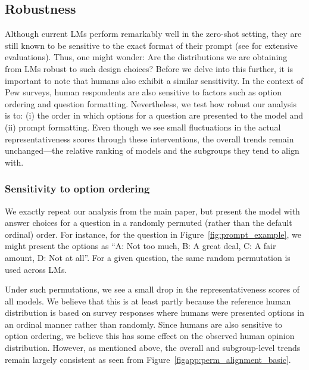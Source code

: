 \clearpage
\subsection{Robustness}
\label{app:robustness}
Although current LMs perform remarkably well in the zero-shot setting, they are still known to be sensitive to the exact format of their prompt (see \citet{eval-harness,liang2022holistic,srivastava2022beyond} for extensive evaluations).
Thus, one might wonder: Are the distributions we are obtaining from LMs robust to such design choices?
Before we delve into this further, it is important to note that humans also exhibit a similar sensitivity.
In the context of Pew surveys, human respondents are also sensitive to factors such as option ordering and question formatting.
Nevertheless, we test how robust our analysis is to: (i) the order in which options for a question are presented to the model and (ii) prompt formatting.
Even though we see small fluctuations in the actual representativeness scores through these interventions, the overall trends remain unchanged---the relative ranking of models and the subgroups they tend to align with.




\subsubsection{Sensitivity to option ordering}

We exactly repeat our analysis from the main paper, but present the model with answer choices for a question in a randomly permuted (rather than the default ordinal) order. 
For instance, for the question in Figure~\ref{fig:prompt_example}, we might present the options as ``A: Not too much, B: A great deal, C: A fair amount, D: Not at all''.
For a given question, the same random permutation is used across LMs. 

Under such permutations, we see a small drop in the representativeness scores of all models.
We believe that this is at least partly because the reference human distribution is based on survey responses where humans were presented options in an ordinal manner rather than randomly.
Since humans are also sensitive to option ordering, we believe this has some effect on the observed human opinion distribution.
However, as mentioned above, the overall and subgroup-level trends remain largely consistent as seen from Figure~\ref{figapp:perm_alignment_basic}.

